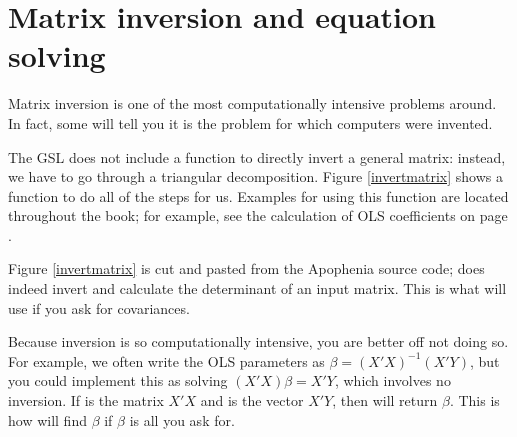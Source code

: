 
\section{Matrix inversion and equation solving}  
Matrix inversion is one of the most computationally intensive problems
around. In fact, some will tell you it is the problem for which computers were invented.

The GSL does not include a function to directly invert a general matrix:
instead, we have to go through a triangular decomposition. Figure
\ref{invertmatrix} shows a function to do all of the steps for us.
Examples for using this function are located throughout the book; for
example, see the calculation of OLS coefficients on page \pageref{ols}.


Figure \ref{invertmatrix} is cut and pasted from the Apophenia source
code;  does indeed invert and calculate the
determinant of an input matrix. This is what  will use if
you ask for covariances.

Because inversion is so computationally intensive, you are better off
not doing so.  For example, we often write the OLS parameters as $\beta
=(X'X)^{-1}(X'Y)$, but you could implement this as solving
$(X'X)\beta = X'Y$, which involves no inversion. If  is the
matrix $X'X$ and  is the vector $X'Y$, then 
 will
return $\beta$. This is how  will find $\beta$ if $\beta$
is all you ask for.

